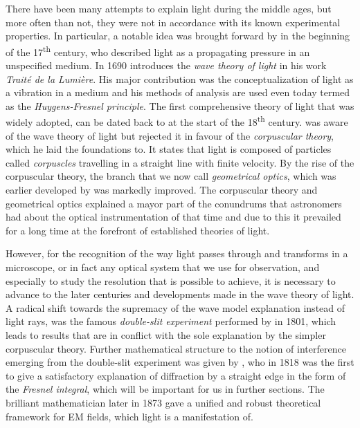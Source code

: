 There have been many attempts to explain light during the middle ages, but more often than not, they were not in 
    accordance with its known experimental properties.
In particular, a notable idea was brought forward by  in the beginning of the
    17\textsuperscript{th} century, who described light as a propagating pressure in an unspecified medium. 
In 1690  introduces the \emph{wave theory of light} in his work \emph{Traité de la
    Lumière}.
His major contribution was the conceptualization of light as a vibration in a medium and his methods of analysis are 
    used even today termed as the \emph{Huygens-Fresnel principle}.
The first comprehensive theory of light that was widely adopted, can be dated back to  at the
    start of the 18\textsuperscript{th} century. %
 was aware of the wave theory of light but rejected it in favour of the \emph{corpuscular theory}, 
    which he laid the foundations to.
It states that light is composed of particles called \emph{corpuscles} travelling in a straight line with finite
    velocity.
By the rise of the corpuscular theory, the branch that we now call \emph{geometrical optics}, which was earlier 
    developed by  was markedly improved.
The corpuscular theory and geometrical optics explained a mayor part of the conundrums that astronomers had about the 
    optical instrumentation of that time and due to this it prevailed for a long time at the forefront of established 
    theories of light.

However, for the recognition of the way light passes through and transforms in a microscope, or in fact any optical 
    system that we use for observation, and especially to study the resolution that is possible to achieve, it is
    necessary to advance to the later centuries and developments made in the wave 
    theory of light.
A radical shift towards the supremacy of the wave model explanation instead of light rays, was the famous 
    \emph{double-slit experiment} performed by  in 1801, which leads to results that are in
    conflict with the sole explanation by the simpler corpuscular theory.
Further mathematical structure to the notion of interference emerging from the double-slit experiment was given by 
    , who in 1818 was the first to give a satisfactory explanation of diffraction by a 
    straight edge in the form of the \emph{Fresnel integral}, which will be important for us in further sections.
The brilliant mathematician  later in 1873 gave a unified and robust theoretical framework
    for \ac{EM} fields, which light is a manifestation of.

